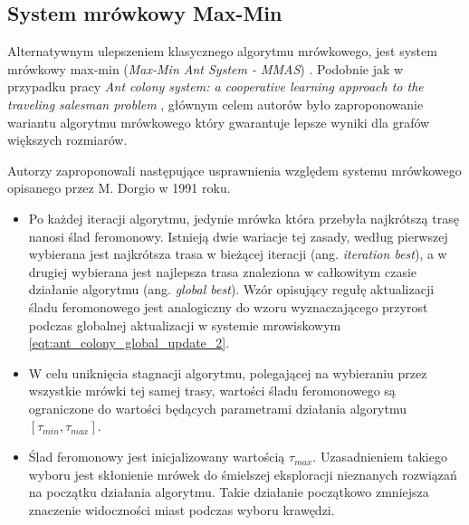 {{        %
        \subsection{System mrówkowy Max-Min}
        {
            Alternatywnym ulepszeniem klasycznego algorytmu mrówkowego, jest system mrówkowy max-min (\textit{Max-Min
            Ant System - MMAS}) \cite{Sttzle2000MAXMINAS}. Podobnie jak w przypadku pracy \textit{Ant colony system: a
            cooperative learning approach to the traveling salesman problem} \cite{Dorigo1997AntCS}, głównym celem
            autorów było zaproponowanie wariantu algorytmu mrówkowego który gwarantuje lepsze wyniki dla grafów
            większych rozmiarów.

            Autorzy zaproponowali następujące usprawnienia względem systemu mrówkowego opisanego przez M. Dorgio w 1991
            roku.

            \begin{itemize}
                \item Po każdej iteracji algorytmu, jedynie mrówka która przebyła najkrótszą trasę nanosi ślad
                feromonowy. Istnieją dwie wariacje tej zasady, według pierwszej wybierana jest najkrótsza trasa w
                bieżącej iteracji (ang. \textit{iteration best}), a w drugiej wybierana jest najlepsza trasa znaleziona
                w całkowitym czasie działanie algorytmu (ang. \textit{global best}). Wzór opisujący regułę aktualizacji
                śladu feromonowego jest analogiczny do wzoru wyznaczającego przyrost podczas globalnej aktualizacji w
                systemie mrowiskowym \ref{eqt:ant_colony_global_update_2}.

                \item W celu uniknięcia stagnacji algorytmu, polegającej na wybieraniu przez wszystkie mrówki tej samej
                trasy, wartości śladu feromonowego są ograniczone do wartości będących parametrami działania algorytmu
                $[\tau_{min}, \tau_{max}]$.

                \item Ślad feromonowy jest inicjalizowany wartością $\tau_{max}$. Uzasadnieniem takiego wyboru jest
                skłonienie mrówek do śmielszej eksploracji nieznanych rozwiązań na początku działania algorytmu. Takie
                działanie początkowo zmniejsza znaczenie widoczności miast podczas wyboru krawędzi.
            \end{itemize}
        }
    }

}
